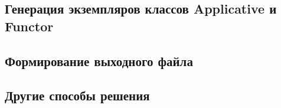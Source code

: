 \subsection{Генерация экземпляров классов Applicative и Functor}
\subsection{Формирование выходного файла}
\subsection{Другие способы решения}


\printbibliography[%
    heading=bibintoc%
]


